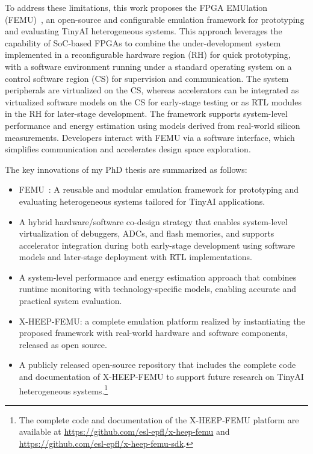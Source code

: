             To address these limitations, this work proposes the FPGA EMUlation (FEMU)~\cite{femu}, an open-source and configurable emulation framework for prototyping and evaluating TinyAI heterogeneous systems. This approach leverages the capability of SoC-based FPGAs to combine the under-development system implemented in a reconfigurable hardware region (RH) for quick prototyping, with a software environment running under a standard operating system on a control software region (CS) for supervision and communication. The system peripherals are virtualized on the CS, whereas accelerators can be integrated as virtualized software models on the CS for early-stage testing or as RTL modules in the RH for later-stage development. The framework supports system-level performance and energy estimation using models derived from real-world silicon measurements. Developers interact with \mbox{FEMU} via a software interface, which simplifies communication and accelerates design space exploration.
        
            The key innovations of my PhD thesis are summarized as follows:

            \vspace{-1em}
            \begin{itemize}
                \item \mbox{FEMU}~\cite{femu}: A reusable and modular emulation framework for prototyping and evaluating heterogeneous systems tailored for TinyAI applications.
        
                \item A hybrid hardware/software co-design strategy that enables system-level virtualization of debuggers, ADCs, and flash memories, and supports accelerator integration during both early-stage development using software models and later-stage deployment with RTL implementations.
        
                \item A system-level performance and energy estimation approach that combines runtime monitoring with technology-specific models, enabling accurate and practical system evaluation.
        
                \item \mbox{X-HEEP-FEMU}: a complete emulation platform realized by instantiating the proposed framework with real-world hardware and software components, released as open source.

                \item A publicly released open-source repository that includes the complete code and documentation of \mbox{X-HEEP-FEMU} to support future research on TinyAI heterogeneous systems.\footnote{The complete code and documentation of the \mbox{X-HEEP-FEMU} platform are available at \url{https://github.com/esl-epfl/x-heep-femu} and \url{https://github.com/esl-epfl/x-heep-femu-sdk}.}
            \end{itemize}
            \vspace{-1em}

